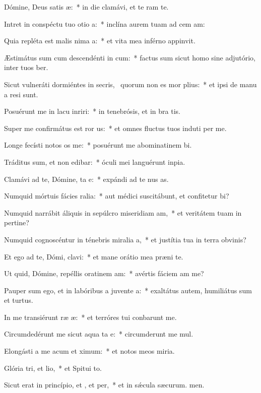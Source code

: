 \item Dómine, Deus satis æ:~* in die clamávi, et te ram te.
\item Intret in conspéctu tuo otio a:~* inclína aurem tuam ad cem am:
\item Quia repléta est malis nima a:~* et vita mea inférno appinvit.
\item Æstimátus sum cum descendénti in cum:~* factus sum sicut homo sine adjutório, inter tuos ber.
\item Sicut vulneráti dormiéntes in secris,~\pscross{} quorum non es mor plius:~* et ipsi de manu a resi sunt.
\item Posuérunt me in lacu inriri:~* in tenebrósis, et in bra tis.
\item Super me confirmátus est ror us:~* et omnes fluctus tuos induti per me.
\item Longe fecísti notos os  me:~* posuérunt me abominatinem bi.
\item Tráditus sum, et non edibar:~* óculi mei languérunt  inpia.
\item Clamávi ad te, Dómine, ta e:~* expándi ad te nus as.
\item Numquid mórtuis fácies ralia:~* aut médici suscitábunt, et confitetur bi?
\item Numquid narrábit áliquis in sepúlcro miseridiam am,~* et veritátem tuam in pertine?
\item Numquid cognoscéntur in ténebris miralia a,~* et justítia tua in terra obvinis?
\item Et ego ad te, Dómi, clavi:~* et mane orátio mea præni te.
\item Ut quid, Dómine, repéllis oratinem am:~* avértis fáciem am  me?
\item Pauper sum ego, et in labóribus a juvente a:~* exaltátus autem, humiliátus sum et turtus.
\item In me transiérunt ræ æ:~* et terróres tui conbarunt me.
\item Circumdedérunt me sicut aqua ta e:~* circumderunt me mul.
\item Elongásti a me acum et ximum:~* et notos meos  miria.
\item Glória tri, et lio,~* et Spitui to.
\item Sicut erat in princípio, et , et per,~* et in sǽcula sæcurum. men.
